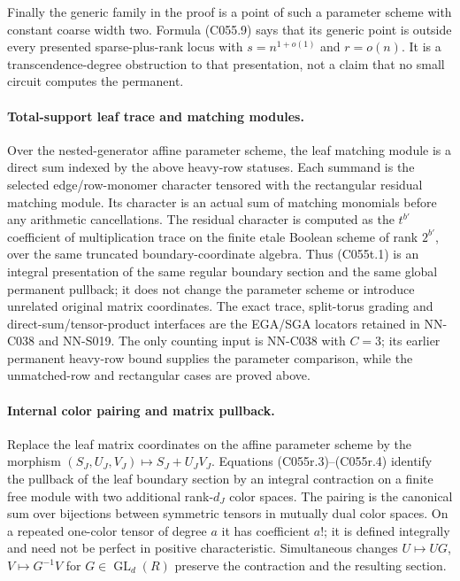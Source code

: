 \begin{geometricstatement}[NN-C055]
Finally the generic family in the proof is a point of such a
parameter scheme with constant coarse width two.  Formula
(C055.9) says that its generic point is outside every presented
sparse-plus-rank locus with $s=n^{1+o(1)}$ and $r=o(n)$.
It is a transcendence-degree obstruction to that presentation,
not a claim that no small circuit computes the permanent.

\paragraph{Total-support leaf trace and matching modules.}
Over the nested-generator affine parameter scheme, the leaf
matching module is a direct sum indexed by the above heavy-row
statuses.  Each summand is the selected edge/row-monomer character
tensored with the rectangular residual matching module.  Its
character is an actual sum of matching monomials before any
arithmetic cancellations.  The residual character is computed as
the $t^{b'}$ coefficient of multiplication trace on the finite
etale Boolean scheme of rank $2^{b'}$, over the same truncated
boundary-coordinate algebra.  Thus (C055t.1) is an integral
presentation of the same regular boundary section and the same
global permanent pullback; it does not change the parameter
scheme or introduce unrelated original matrix coordinates.
The exact trace, split-torus grading and direct-sum/tensor-product
interfaces are the EGA/SGA locators retained in NN-C038 and NN-S019.
The only counting input is NN-C038 with $C=3$; its earlier
permanent heavy-row bound supplies the parameter comparison,
while the unmatched-row and rectangular cases are proved above.

\paragraph{Internal color pairing and matrix pullback.}
Replace the leaf matrix coordinates on the affine parameter scheme
by the morphism $(S_J,U_J,V_J)\mapsto S_J+U_JV_J$.
Equations (C055r.3)--(C055r.4) identify the pullback of the
leaf boundary section by an integral contraction on a finite
free module with two additional rank-$d_J$ color spaces.
The pairing is the canonical sum over bijections between
symmetric tensors in mutually dual color spaces.  On a repeated
one-color tensor of degree $a$ it has coefficient $a!$;
it is defined integrally and need not be perfect in positive
characteristic.  Simultaneous changes $U\mapsto UG$,
$V\mapsto G^{-1}V$ for $G\in\operatorname{GL}_d(R)$ preserve
the contraction and the resulting section.


\end{geometricstatement}
